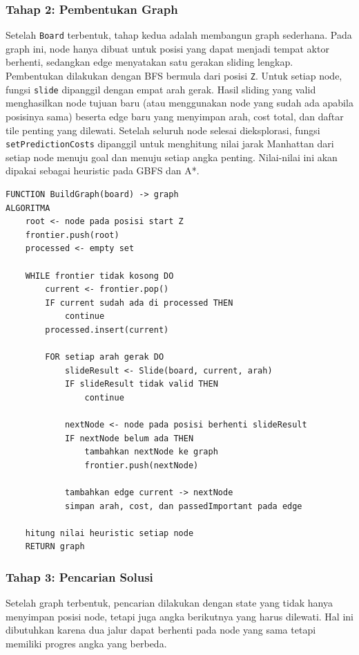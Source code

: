 \documentclass[a4paper,11pt]{article}
\begin{document}
\subsubsection{Tahap 2: Pembentukan Graph}
Setelah \texttt{Board} terbentuk, tahap kedua adalah membangun graph sederhana. Pada graph ini, node hanya dibuat untuk posisi yang dapat menjadi tempat aktor berhenti, sedangkan edge menyatakan satu gerakan sliding lengkap. Pembentukan dilakukan dengan BFS bermula dari posisi \texttt{Z}. Untuk setiap node, fungsi \texttt{slide} dipanggil dengan empat arah gerak. Hasil sliding yang valid menghasilkan node tujuan baru (atau menggunakan node yang sudah ada apabila posisinya sama) beserta edge baru yang menyimpan arah, cost total, dan daftar tile penting yang dilewati. Setelah seluruh node selesai dieksplorasi, fungsi \texttt{setPredictionCosts} dipanggil untuk menghitung nilai jarak Manhattan dari setiap node menuju goal dan menuju setiap angka penting. Nilai-nilai ini akan dipakai sebagai heuristic pada GBFS dan A*.

\begin{lstlisting}[language=Pseudocode, caption=Pseudocode Pembentukan Graph Sederhana, label={lst:buildgraph}]
FUNCTION BuildGraph(board) -> graph
ALGORITMA
    root <- node pada posisi start Z
    frontier.push(root)
    processed <- empty set

    WHILE frontier tidak kosong DO
        current <- frontier.pop()
        IF current sudah ada di processed THEN
            continue
        processed.insert(current)

        FOR setiap arah gerak DO
            slideResult <- Slide(board, current, arah)
            IF slideResult tidak valid THEN
                continue

            nextNode <- node pada posisi berhenti slideResult
            IF nextNode belum ada THEN
                tambahkan nextNode ke graph
                frontier.push(nextNode)

            tambahkan edge current -> nextNode
            simpan arah, cost, dan passedImportant pada edge

    hitung nilai heuristic setiap node
    RETURN graph
\end{lstlisting}

\subsubsection{Tahap 3: Pencarian Solusi}
Setelah graph terbentuk, pencarian dilakukan dengan state yang tidak hanya menyimpan posisi node, tetapi juga angka berikutnya yang harus dilewati. Hal ini dibutuhkan karena dua jalur dapat berhenti pada node yang sama tetapi memiliki progres angka yang berbeda.
\end{document}
